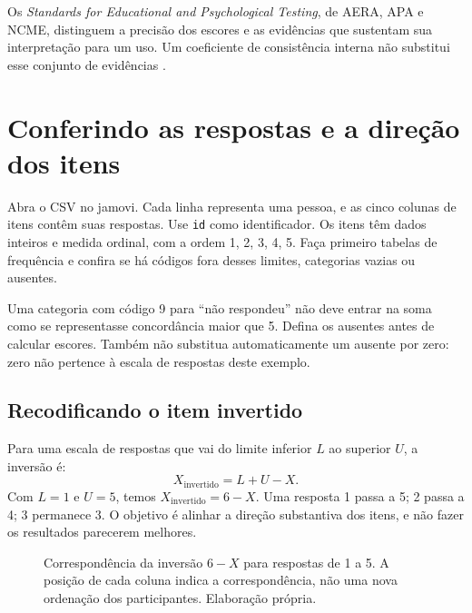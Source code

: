 Os \textit{Standards for Educational and Psychological Testing}, de AERA, APA e NCME, distinguem a precisão dos escores e as evidências que sustentam sua interpretação para um uso. Um coeficiente de consistência interna não substitui esse conjunto de evidências \parencite{Standards2014}.

\section{Conferindo as respostas e a direção dos itens}

Abra o CSV no jamovi. Cada linha representa uma pessoa, e as cinco colunas de itens contêm suas respostas. Use \texttt{id} como identificador. Os itens têm dados inteiros e medida ordinal, com a ordem 1, 2, 3, 4, 5. Faça primeiro tabelas de frequência e confira se há códigos fora desses limites, categorias vazias ou ausentes.

Uma categoria com código 9 para ``não respondeu'' não deve entrar na soma como se representasse concordância maior que 5. Defina os ausentes antes de calcular escores. Também não substitua automaticamente um ausente por zero: zero não pertence à escala de respostas deste exemplo.

\subsection{Recodificando o item invertido}

Para uma escala de respostas que vai do limite inferior $L$ ao superior $U$, a inversão é:
\[
X_{\mathrm{invertido}}=L+U-X.
\]
Com $L=1$ e $U=5$, temos $X_{\mathrm{invertido}}=6-X$. Uma resposta 1 passa a 5; 2 passa a 4; 3 permanece 3. O objetivo é alinhar a direção substantiva dos itens, e não fazer os resultados parecerem melhores.

\begin{figure}[H]
\centering
{}
\caption{Correspondência da inversão $6-X$ para respostas de 1 a 5. A posição de cada coluna indica a correspondência, não uma nova ordenação dos participantes. Elaboração própria.}
\label{fig:inversao-item}
\end{figure}

